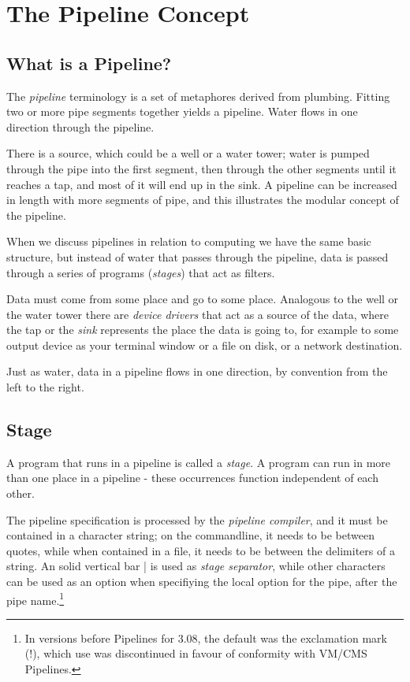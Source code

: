 \chapter{The Pipeline Concept}
\section{What is a Pipeline?}
The \emph{pipeline} terminology is a set of metaphores derived from
plumbing. Fitting two or more pipe segments together yields a
pipeline. Water flows in one direction through the pipeline.

There is a source, which could be a well or a water tower; water is
pumped through the pipe into the first segment, then through the other
segments until it reaches a tap, and most of it will end up in the
sink. A pipeline can be increased in length with more segments of
pipe, and this illustrates the modular concept of the pipeline.

When we discuss pipelines in relation to computing we have the same
basic structure, but instead of water that passes through the
pipeline, data is passed through a series of programs (\emph{stages})
that act as filters.

Data must come from some place and go to some place. Analogous to the
well or the water tower there are \emph{device drivers} that act as a
source of the data, where the tap or the \emph{sink} represents the place the
data is going to, for example to some output device as your terminal
window or a file on disk, or a network destination.

Just as water, data in a pipeline flows in one direction, by
convention from the left to the right.
\section{Stage}
A program that runs in a pipeline is called a \emph{stage}. A program
can run in more than one place in a pipeline - these occurrences
function independent of each other. 

The pipeline specification is processed by the \emph{pipeline
  compiler}, and it must be contained in a character string; on the
commandline, it needs to be between quotes, while when contained in a
file, it needs to be between the delimiters of a \nr{} string. An
solid vertical bar | is used as \emph{stage separator}, while other characters
can be used as an option when specifiying the
local option for the pipe, after the pipe name.\footnote{In versions
  before Pipelines for \nr{} 3.08, the default was the exclamation
  mark (!), which use was discontinued in favour of conformity with
  VM/CMS Pipelines.}

